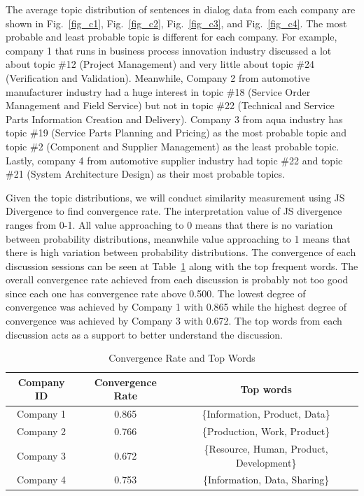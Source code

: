 \documentclass[senior]{IPSstyle}
\begin{document}
The average topic distribution of sentences in dialog data from each company are shown in Fig.~\ref{fig_c1}, Fig.~\ref{fig_c2}, Fig.~\ref{fig_c3}, and Fig.~\ref{fig_c4}. The most probable and least probable topic is different for each company. For example, company 1 that runs in business process innovation industry discussed a lot about topic \#12 (Project Management) and very little about topic \#24 (Verification and Validation). Meanwhile, Company 2 from automotive manufacturer industry had a huge interest in topic \#18 (Service Order Management and Field Service) but not in topic \#22 (Technical and Service Parts Information Creation and Delivery). Company 3 from aqua industry has topic \#19 (Service Parts Planning and Pricing) as the most probable topic and topic \#2 (Component and Supplier Management) as the least probable topic. Lastly, company 4 from automotive supplier industry had topic \#22 and topic \#21 (System Architecture Design) as their most probable topics.

Given the topic distributions, we will conduct similarity measurement using JS Divergence to find convergence rate. The interpretation value of JS divergence ranges from 0-1. All value approaching to 0 means that there is no variation between probability distributions, meanwhile value approaching to 1 means that there is high variation between probability distributions. The convergence of each discussion sessions can be seen at Table~\ref{table 6: similarity} along with the top frequent words. The overall convergence rate achieved from each discussion is probably not too good since each one has convergence rate above 0.500. The lowest degree of convergence was achieved by Company 1 with 0.865 while the highest degree of convergence was achieved by Company 3 with 0.672. The top words from each discussion acts as a support to better understand the discussion.

\begin{table}[h]
\caption{Convergence Rate and Top Words}
\label{table 6: similarity}
\centering
{\begin{tabular}{|c|c|c|}
\hline
\textbf{Company ID}&\textbf{Convergence Rate}&\textbf{Top words}\\
\hline
Company 1&0.865&\{Information, Product, Data\}  \\
\hline
Company 2&0.766&\{Production, Work, Product\} \\
\hline
Company 3&0.672&\{Resource, Human, Product, Development\} \\
\hline
Company 4&0.753&\{Information, Data, Sharing\} \\
\hline
\end{tabular}}
\end{table}
\end{document}
